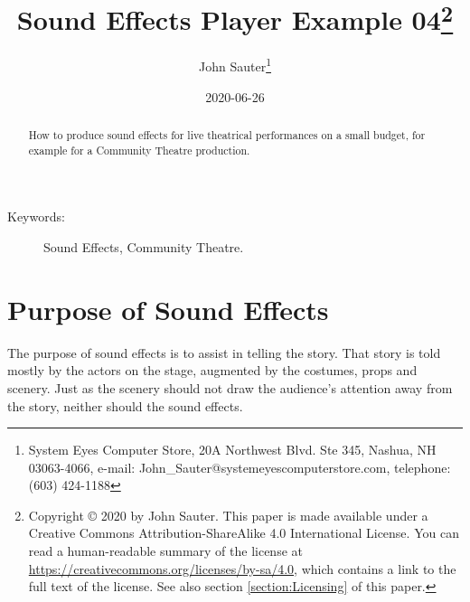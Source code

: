 \documentclass[letterpaper,twoside]{article}
\begin{document}
\title{Sound Effects Player Example 04\footnote{Copyright
    {\copyright} 2020 by John Sauter.
    This paper is made available under a
    Creative Commons Attribution-ShareAlike 4.0 International License.
    You can read a human-readable summary of the license at
    \url{https://creativecommons.org/licenses/by-sa/4.0}, which contains
    a link to the full text of the license.
    See also section \ref{section:Licensing} of this paper.}
}
\author{John Sauter\footnote{
    System Eyes Computer Store,
    20A Northwest Blvd.  Ste 345,
    Nashua, NH  03063-4066,
    e-mail: John\_Sauter@systemeyescomputerstore.com,
    telephone: (603) 424-1188}}
\date{2020-06-26}
\maketitle
\begin{abstract}
  How to produce sound effects for live theatrical performances
  on a small budget,
  for example for a Community Theatre production.
\end{abstract}
\begin{description}
\item[Keywords:]Sound Effects, Community Theatre.
\end{description}
  
\newpage
\section{Purpose of Sound Effects}
The purpose of sound effects is to assist in telling the story.
That story is told mostly by the actors on the stage, augmented
by the costumes, props and scenery.  Just as the scenery should
not draw the audience's attention away from the story, neither
should the sound effects.
\end{document}

